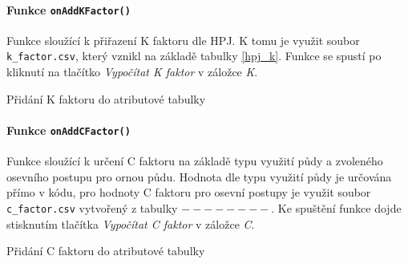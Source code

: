 \paragraph{Funkce \texttt{onAddKFactor()}}
Funkce sloužící k přiřazení K faktoru dle HPJ. K tomu je využit soubor \texttt{k\_factor.csv}, který vznikl na základě tabulky \ref{hpj_k}. Funkce se spustí po kliknutí na tlačítko \textit{Vypočítat K faktor} v záložce \textit{K}.
\begin{algorithm}
\caption{Přidání K faktoru do atributové tabulky}
\label{alg:onAddKFactor}
    \begin{algorithmic}[1]
    	\ENDIF
    		\ELSE
    		\ENDIF
    	\ENDFOR
    \end{algorithmic}
\end{algorithm}

\paragraph{Funkce \texttt{onAddCFactor()}}
Funkce sloužící k určení C faktoru na základě typu využití půdy a zvoleného osevního postupu pro ornou půdu. Hodnota dle typu využití půdy je určována přímo v kódu, pro hodnoty C faktoru pro osevní postupy je využit soubor \texttt{c\_factor.csv} vytvořený z tabulky $--------$. Ke spuštění funkce dojde stisknutím tlačítka \textit{Vypočítat C faktor} v záložce \textit{C}.
\begin{algorithm}
\caption{Přidání C faktoru do atributové tabulky}
\label{alg:onAddKFactor}
    \begin{algorithmic}[1]
      	\ENDIF
    		\ENDIF
    	\ENDFOR
    \end{algorithmic}
\end{algorithm}
\FloatBarrier

